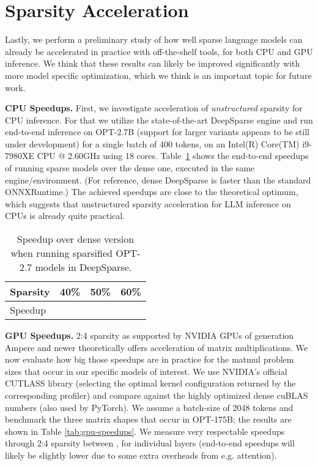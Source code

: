 \documentclass{article}
\theoremstyle{plain}
\theoremstyle{definition}
\theoremstyle{remark}
\renewcommand{\paragraph}[1]{\vspace{-0.1em} \noindent \textbf{#1}}
\begin{document}
\section{Sparsity Acceleration}
\label{app:speedup}

Lastly, we perform a preliminary study of how well sparse language models can already be accelerated in practice with off-the-shelf tools, for both CPU and GPU inference. We think that these results can likely be improved significantly with more model specific optimization, which we think is an important topic for future work.

\paragraph{CPU Speedups.} First, we investigate acceleration of \textit{unstructured} sparsity for CPU inference. For that we utilize the state-of-the-art DeepSparse engine \cite{deepsparse} and run end-to-end inference on OPT-2.7B (support for larger variants appears to be still under development) for a single batch of 400 tokens, on an Intel(R) Core(TM) i9-7980XE CPU @ 2.60GHz using 18 cores. Table~\ref{tab:cpu-inference} shows the end-to-end speedups of running sparse models over the dense one, executed in the same engine/environment. (For reference, dense DeepSparse is  faster than the standard ONNXRuntime.) The achieved speedups are close to the theoretical optimum, which suggests that unstructured sparsity acceleration for LLM inference on CPUs is already quite practical.

\begin{table}[h!]
    \centering
    \begin{tabular}{|l|c|c|c|}
        \toprule
        Sparsity & 40\% & 50\% & 60\%  \\
        \midrule
        Speedup &  &  &  \\
        \bottomrule
    \end{tabular}
    \caption{Speedup over dense version when running sparsified OPT-2.7 models in DeepSparse.}
    \label{tab:cpu-inference}
\end{table}

\paragraph{GPU Speedups.} 2:4 sparsity as supported by NVIDIA GPUs of generation Ampere and newer theoretically offers  acceleration of matrix multiplications. We now evaluate how big those speedups are in practice for the matmul problem sizes that occur in our specific models of interest. We use NVIDIA's official CUTLASS library (selecting the optimal kernel configuration returned by the corresponding profiler) and compare against the highly optimized dense cuBLAS numbers (also used by PyTorch). We assume a batch-size of 2048 tokens and benchmark the three matrix shapes that occur in OPT-175B; the results are shown in Table \ref{tab:gpu-speedups}. We measure very respectable speedups through 2:4 sparsity between , for individual layers (end-to-end speedups will likely be slightly lower due to some extra overheads from e.g. attention).
\end{document}
